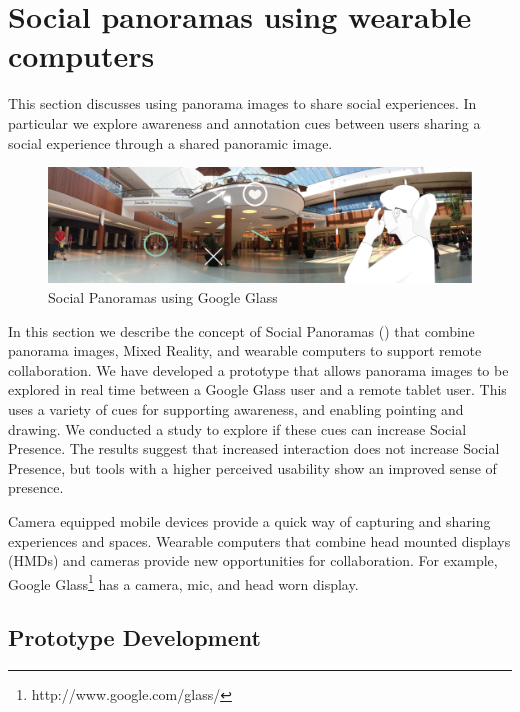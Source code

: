 \section{Social panoramas using wearable computers}
\label{sec:pano}

This section discusses using panorama images to share social experiences. In particular we explore awareness and annotation cues between users sharing a social experience through a shared panoramic image.

\begin{figure}[ht]
	\centering
	\includegraphics[width=\linewidth]{images/ismar14/concept}
	\caption{Social Panoramas using Google Glass}
	\label{fig:ismar14:concept}
\end{figure}

In this section we describe the concept of Social Panoramas (\cite{Reichherzer2014, Billinghurst2014}) that combine panorama images, Mixed Reality, and wearable computers to support remote collaboration. We have developed a prototype that allows panorama images to be explored in real time between a Google Glass user and a remote tablet user. This uses a variety of cues for supporting awareness, and enabling pointing and drawing. We conducted a study to explore if these cues can increase Social Presence. The results suggest that increased interaction does not increase Social Presence, but tools with a higher perceived usability show an improved sense of presence.

Camera equipped mobile devices provide a quick way of capturing and sharing experiences and spaces. Wearable
computers that combine head mounted displays (HMDs) and cameras provide new opportunities for collaboration. For example, Google Glass\footnote{http://www.google.com/glass/} has a camera, mic, and head worn display.


\subsection{Prototype Development}

